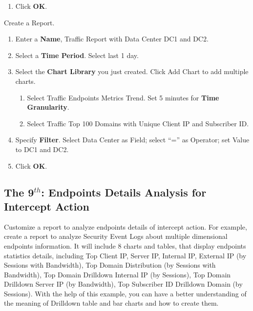\begin{description}
\begin{enumerate}
\begin{enumerate}
            \item 	Click \textbf{OK}.
        \end{enumerate}
    \end{enumerate}
    \item[STEP 3.]	Create a Report. 
    \begin{enumerate}
        \item Enter a \textbf{Name}, Traffic Report with Data Center DC1 and DC2. 
        \item Select a \textbf{Time Period}. Select last 1 day.
        \item Select the \textbf{Chart Library} you just created. Click Add Chart to add multiple charts.
        \begin{enumerate}
            \item	Select Traffic Endpoints Metrics Trend. Set 5 minutes for \textbf{Time Granularity}.
            \item	Select Traffic Top 100 Domains with Unique Client IP and Subscriber ID.
        \end{enumerate}
        \item Specify \textbf{Filter}. Select Data Center as Field; select “=” as Operator; set Value to DC1 and DC2. 
        \item Click \textbf{OK}.
    \end{enumerate}
\end{description}

\subsection*{\hypertarget{link:The 9th: Endpoints Details Analysis for Intercept Action }{The 9$^{th}$: Endpoints Details Analysis for Intercept Action }}
\label{sec:appendix_f:report:9th}

Customize a report to analyze endpoints details of intercept action. For example, create a report to analyze Security Event Logs about multiple dimensional endpoints information. It will include 8 charts and tables, that display endpoints statistics details, including Top Client IP, Server IP, Internal IP, External IP (by Sessions with Bandwidth), Top Domain Distribution (by Sessions with Bandwidth), Top Domain Drilldown Internal IP (by Sessions), Top Domain Drilldown Server IP (by Bandwidth), Top Subscriber ID Drilldown Domain (by Sessions). With the help of this example, you can have a better understanding of the meaning of Drilldown table and bar charts and how to create them.


